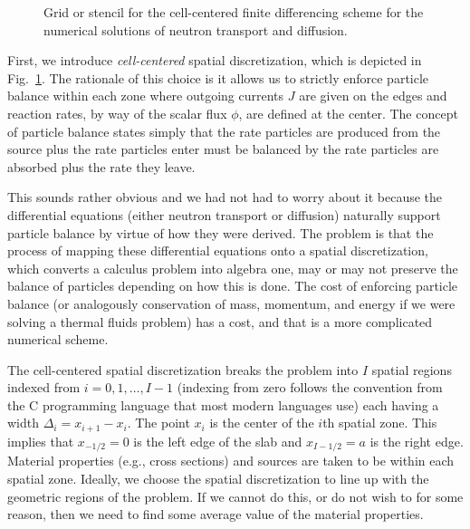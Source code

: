 \begin{figure}[tb!]
\begin{center}
\caption{Grid or stencil for the cell-centered finite differencing scheme for the numerical solutions of neutron transport and diffusion.}
\label{Fig:neutronics_finiteDifferenceStencil}
\end{center}
\end{figure}

First, we introduce \emph{cell-centered} spatial discretization, which is depicted in Fig.~\ref{Fig:neutronics_finiteDifferenceStencil}. The rationale of this choice is it allows us to strictly enforce particle balance within each zone where outgoing currents $J$ are given on the edges and reaction rates, by way of the scalar flux $\phi$, are defined at the center. The concept of particle balance states simply that the rate particles are produced from the source plus the rate particles enter must be balanced by the rate particles are absorbed plus the rate they leave. 

This sounds rather obvious and we had not had to worry about it because the differential equations (either neutron transport or diffusion) naturally support particle balance by virtue of how they were derived. The problem is that the process of mapping these differential equations onto a spatial discretization, which converts a calculus problem into algebra one, may or may not preserve the balance of particles depending on how this is done. The cost of enforcing particle balance (or analogously conservation of mass, momentum, and energy if we were solving a thermal fluids problem) has a cost, and that is a more complicated numerical scheme.

The cell-centered spatial discretization breaks the problem into $I$ spatial regions indexed from $i = 0, 1, \ldots, I-1$ (indexing from zero follows the convention from the C programming language that most modern languages use) each having a width $\Delta_i = x_{i+1} - x_i$. The point $x_i$ is the center of the $i$th spatial zone. This implies that $x_{-1/2} = 0$ is the left edge of the slab and $x_{I-1/2} = a$ is the right edge. Material properties (e.g., cross sections) and sources are taken to be within each spatial zone. Ideally, we choose the spatial discretization to line up with the geometric regions of the problem. If we cannot do this, or do not wish to for some reason, then we need to find some average value of the material properties.

